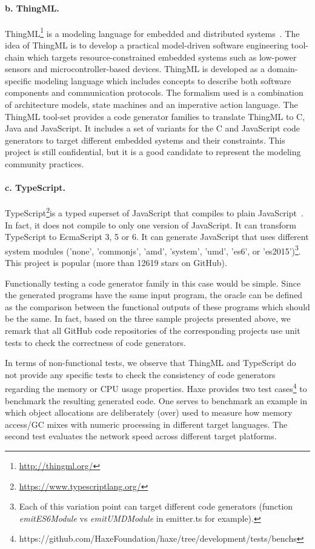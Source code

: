 \paragraph{b. ThingML.} ThingML\footnote{\url{http://thingml.org/}} is a modeling language for embedded and distributed systems~\cite{fleurey2011mde}. The idea of ThingML is to develop a practical model-driven software engineering tool-chain which targets resource-constrained embedded systems such as low-power sensors and microcontroller-based devices. ThingML is developed as a domain-specific modeling language which includes concepts to describe both software components and communication protocols. The formalism used is a combination of architecture models, state machines and an imperative action language. The ThingML tool-set provides a  code generator families  to translate ThingML to C, Java and JavaScript. It includes a set of variants for the C and JavaScript code generators to target different embedded systems and their constraints. 
This project is still confidential, but it is a good candidate to represent the modeling community practices.

\paragraph{c. TypeScript.} TypeScript\footnote{\url{https://www.typescriptlang.org/}}is a typed superset of JavaScript that compiles to plain JavaScript~\cite{rastogi2015safe}. In fact, it does not compile to only one version of JavaScript. It can transform TypeScript to EcmaScript 3, 5 or 6. It can generate JavaScript that uses different system modules ('none', 'commonjs', 'amd', 'system', 'umd', 'es6', or 'es2015')\footnote{Each of this variation point can target different code generators (function \textit{emitES6Module} vs \textit{emitUMDModule} in emitter.ts for example).}. 
This project is popular (more than \num{12619} stars on GitHub).

Functionally testing a code generator family in this case would be simple. Since the generated programs have the same input program, the oracle can be defined as the comparison between the functional outputs of these programs which should be the same.
In fact, based on the three sample projects presented above, we remark that all GitHub code repositories of the corresponding projects use unit tests to check the correctness of code generators.  

In terms of non-functional tests, we observe that ThingML and TypeScript do not provide any specific tests to check the consistency of code generators regarding the memory or CPU usage properties. Haxe provides two test cases\footnote{https://github.com/HaxeFoundation/haxe/tree/development/tests/benchs} to benchmark the resulting generated code. One serves to benchmark an example in which object allocations are deliberately (over) used to measure how memory access/GC mixes with numeric processing in different target languages. The second test evaluates the network speed across different target platforms.


